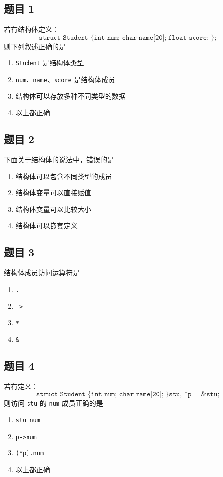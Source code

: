 \documentclass[12pt,a4paper]{ctexart}
\begin{document}
\subsection*{题目 1}
若有结构体定义：
\[
\texttt{struct Student \{ int num; char name[20]; float score; \};}
\]
则下列叙述正确的是
\begin{enumerate}[label=\Alph*.]
    \item \texttt{Student} 是结构体类型
    \item \texttt{num}、\texttt{name}、\texttt{score} 是结构体成员
    \item 结构体可以存放多种不同类型的数据
    \item 以上都正确
\end{enumerate}

\subsection*{题目 2}
下面关于结构体的说法中，错误的是
\begin{enumerate}[label=\Alph*.]
    \item 结构体可以包含不同类型的成员
    \item 结构体变量可以直接赋值
    \item 结构体变量可以比较大小
    \item 结构体可以嵌套定义
\end{enumerate}

\subsection*{题目 3}
结构体成员访问运算符是
\begin{enumerate}[label=\Alph*.]
    \item \texttt{.}
    \item \texttt{->}
    \item \texttt{*}
    \item \texttt{\&}
\end{enumerate}

\subsection*{题目 4}
若有定义：
\[
\texttt{struct Student \{ int num; char name[20]; \} stu, *p = \&stu;}
\]
则访问 \texttt{stu} 的 \texttt{num} 成员正确的是
\begin{enumerate}[label=\Alph*.]
    \item \texttt{stu.num}
    \item \texttt{p->num}
    \item \texttt{(*p).num}
    \item 以上都正确
\end{enumerate}
\end{document}
